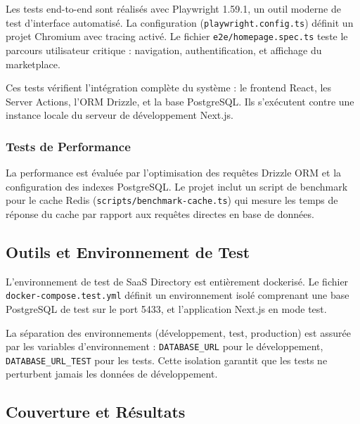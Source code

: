 Les tests end-to-end sont réalisés avec Playwright 1.59.1, un outil moderne de test d'interface automatisé. La configuration (\texttt{playwright.config.ts}) définit un projet Chromium avec tracing activé. Le fichier \texttt{e2e/homepage.spec.ts} teste le parcours utilisateur critique : navigation, authentification, et affichage du marketplace.



Ces tests vérifient l'intégration complète du système : le frontend React, les Server Actions, l'ORM Drizzle, et la base PostgreSQL. Ils s'exécutent contre une instance locale du serveur de développement Next.js.



\subsubsection{Tests de Performance}



La performance est évaluée par l'optimisation des requêtes Drizzle ORM et la configuration des indexes PostgreSQL. Le projet inclut un script de benchmark pour le cache Redis (\texttt{scripts/benchmark-cache.ts}) qui mesure les temps de réponse du cache par rapport aux requêtes directes en base de données.



\subsection{Outils et Environnement de Test}



L'environnement de test de SaaS Directory est entièrement dockerisé. Le fichier \texttt{docker-compose.test.yml} définit un environnement isolé comprenant une base PostgreSQL de test sur le port 5433, et l'application Next.js en mode test.



La séparation des environnements (développement, test, production) est assurée par les variables d'environnement : \texttt{DATABASE\_URL} pour le développement, \texttt{DATABASE\_URL\_TEST} pour les tests. Cette isolation garantit que les tests ne perturbent jamais les données de développement.



\subsection{Couverture et Résultats}



